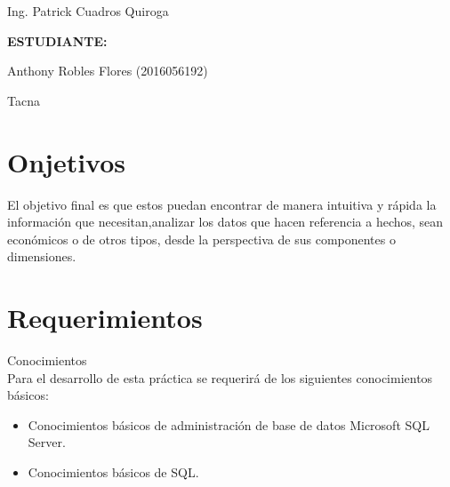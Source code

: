 \documentclass[12pt,letterpaper]{article}
\begin{document}
\begin{titlepage}
\begin{center}
\vspace*{0.1in}
\begin{large}
 Ing. Patrick Cuadros Quiroga\\
\end{large}

\vspace*{0.4in}
\vspace*{0.1in}
\begin{large}
\textbf{ESTUDIANTE:} \\
\begin{flushleft}
Anthony Robles Flores \hfill	(2016056192)\\

\centering  %
\vspace*{0.9in}
\begin{large}
Tacna
\end{large}

\end{flushleft}
\end{large}
\end{center}

\end{titlepage}


\tableofcontents %
\thispagestyle{empty} %
\newpage
\setcounter{page}{1} %


\section{Onjetivos}
El objetivo final es que estos puedan encontrar de manera intuitiva y rápida la información que necesitan,analizar los datos que hacen referencia a hechos, sean económicos o de otros tipos, desde la perspectiva de sus componentes o dimensiones.


\section{Requerimientos}
Conocimientos
\\
Para el desarrollo de esta práctica se requerirá de los siguientes conocimientos básicos:
	\begin{itemize}
	\item Conocimientos básicos de administración de base de datos Microsoft SQL Server.
	\item Conocimientos básicos de SQL.
	\end{itemize}
\end{document}
